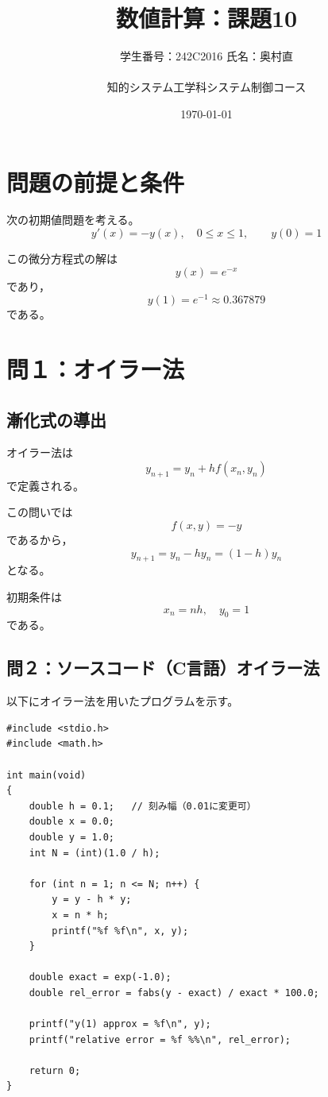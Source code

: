 \documentclass[10pt,a4paper,titlepage]{jreport} %
\title{数値計算：課題10} %
\author{
  学生番号：242C2016  氏名：奥村直 \\
  \\
  知的システム工学科システム制御コース
  } %
\date{\today} %
\begin{document}
\maketitle

\section{問題の前提と条件}

次の初期値問題を考える。
\begin{equation}
y'(x) = -y(x), \quad 0 \le x \le 1, \qquad y(0)=1
\end{equation}

この微分方程式の解は
\begin{equation}
y(x) = e^{-x}
\end{equation}
であり，
\begin{equation}
y(1) = e^{-1} \approx 0.367879
\end{equation}
である。

\section{問１：オイラー法}

\subsection{漸化式の導出}

オイラー法は
\begin{equation}
y_{n+1} = y_n + h f(x_n, y_n)
\end{equation}
で定義される。

この問いでは
\[
f(x,y)=-y
\]
であるから，
\begin{equation}
y_{n+1} = y_n - h y_n = (1-h)y_n
\end{equation}
となる。

初期条件は
\[
x_n = nh, \quad y_0 = 1
\]
である。

\subsection{問２：ソースコード（C言語）オイラー法}

以下にオイラー法を用いたプログラムを示す。

\begin{lstlisting}
#include <stdio.h>
#include <math.h>

int main(void)
{
    double h = 0.1;   // 刻み幅（0.01に変更可）
    double x = 0.0;
    double y = 1.0;
    int N = (int)(1.0 / h);

    for (int n = 1; n <= N; n++) {
        y = y - h * y;
        x = n * h;
        printf("%f %f\n", x, y);
    }

    double exact = exp(-1.0);
    double rel_error = fabs(y - exact) / exact * 100.0;

    printf("y(1) approx = %f\n", y);
    printf("relative error = %f %%\n", rel_error);

    return 0;
}
\end{lstlisting}
\end{document}
